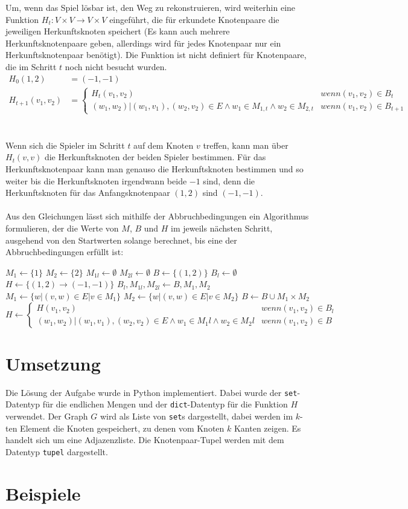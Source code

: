 \documentclass[a4paper,10pt,ngerman]{scrartcl}
\begin{document}
Um, wenn das Spiel lösbar ist, den Weg zu rekonstruieren, wird weiterhin eine  Funktion $H_t:V\times V \rightarrow V \times V$ eingeführt, die für erkundete Knotenpaare die jeweiligen Herkunftsknoten speichert (Es kann auch mehrere Herkunftsknotenpaare geben, allerdings wird für jedes Knotenpaar nur ein Herkunftsknotenpaar benötigt). Die Funktion ist nicht definiert für Knotenpaare, die im Schritt $t$ noch nicht besucht wurden.
\begin{align*}
H_0(1,2) &= (-1, -1) \\
H_{t+1}(v_1,v_2) &= \begin{cases}
H_{t}(v_1, v_2) &wenn (v_1,v_2) \in B_t\\
(w_1, w_2)|(w_1,v_1), (w_2,v_2) \in E \land w_1 \in M_{1,t} \land w_2 \in M_{2, t}&wenn (v_1,v_2) \in B_{t+1}
\end{cases}
\end{align*}\\\\
Wenn sich die Spieler im Schritt $t$ auf dem Knoten $v$ treffen, kann man über $H_{t}(v,v)$ die Herkunftsknoten der beiden Spieler bestimmen. Für das Herkunftsknotenpaar kann man genauso die Herkunftsknoten bestimmen und so weiter bis die Herkunftsknoten irgendwann beide $-1$ sind, denn die Herkunftsknoten für das Anfangsknotenpaar $(1,2)$ sind $(-1, -1)$.\\\\
Aus den Gleichungen lässt sich mithilfe der Abbruchbedingungen ein Algorithmus formulieren, der die Werte von $M$, $B$ und $H$ im jeweils nächsten Schritt, ausgehend von den Startwerten solange berechnet, bis eine der Abbruchbedingungen erfüllt ist:
\begin{algorithmic}
\State $M_1 \gets \{1\}$
\State $M_2 \gets \{2\}$
\State $M_{1l} \gets \emptyset$
\State $M_{2l} \gets \emptyset$
\State $B \gets \{(1, 2)\}$
\State $B_l \gets \emptyset$
\State $H \gets \{(1, 2) \rightarrow (-1, -1)\}$
\State $B_l, M_{1l}, M_{2l} \gets B, M_1, M_2$
\State $M_1 \gets \{w | (v, w) \in E | v \in M_1\} $
\State $M_2 \gets \{w | (v, w) \in E | v \in M_2\} $
\State $B \gets B \cup M_1 \times M_2$
\State $H \gets \begin{cases}
H(v_1, v_2) &wenn (v_1,v_2) \in B_l\\
(w_1, w_2)|(w_1,v_1), (w_2,v_2) \in E \land w_1 \in M_1l \land w_2 \in M_2l&wenn (v_1,v_2) \in B
\end{cases}$
\EndWhile
\end{algorithmic}
\section{Umsetzung}
Die Lösung der Aufgabe wurde in Python implementiert. Dabei wurde der \lstinline|set|-Datentyp für die endlichen Mengen und der \lstinline|dict|-Datentyp für die Funktion $H$ verwendet. Der Graph $G$ wird als Liste von \lstinline|set|s dargestellt, dabei werden im $k$-ten Element die Knoten gespeichert, zu denen vom Knoten $k$ Kanten zeigen. Es handelt sich um eine Adjazenzliste. Die Knotenpaar-Tupel werden mit dem Datentyp \lstinline|tupel| dargestellt. \\

\section{Beispiele}
\end{document}
